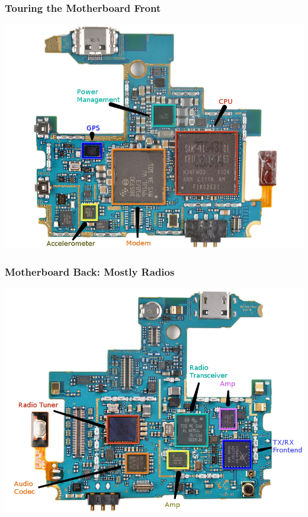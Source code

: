 \begin{frame}
\frametitle{Touring the Motherboard Front}

\begin{center}
\includegraphics[width=.9\textwidth]{images/Galaxy_Logic_Board_Edited_2_small_annotated.jpg}
\end{center}

\end{frame}

\begin{frame}
\frametitle{Motherboard Back: Mostly Radios}

\begin{center}
\includegraphics[width=.9\textwidth]{images/Galaxy_Logic_Board_Edited_1_small_annotated.jpg}
\end{center}

\end{frame}

